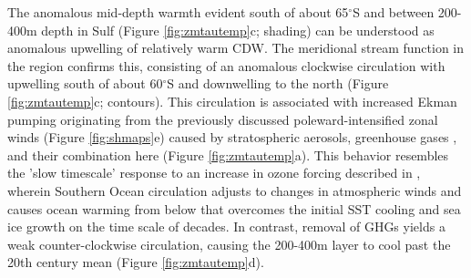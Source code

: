\documentclass[draft,grl]{AGUTeX}  %
\begin{document}
\begin{article}
The anomalous mid-depth warmth evident south of about 65$^\circ$S and between 200-400m depth in Sulf  (Figure \ref{fig:zmtautemp}c; shading) can be understood as anomalous upwelling of relatively warm CDW. The meridional stream function in the region confirms this, consisting of an anomalous clockwise circulation with upwelling south of about 60$^\circ$S and downwelling to the north (Figure \ref{fig:zmtautemp}c; contours). This circulation is associated with increased Ekman pumping originating from the previously discussed poleward-intensified zonal winds (Figure \ref{fig:shmaps}e) caused by stratospheric aerosols, greenhouse gases \citep{fyfe07}, and their combination here (Figure \ref{fig:zmtautemp}a). This behavior resembles the 'slow timescale' response to an increase in ozone forcing described in \citet{ferreira14}, wherein Southern Ocean circulation adjusts to changes in atmospheric winds and causes ocean warming from below that overcomes the initial SST cooling and sea ice growth on the time scale of decades. In contrast, removal of GHGs yields a weak counter-clockwise circulation, causing the 200-400m layer to cool past the 20th century mean (Figure \ref{fig:zmtautemp}d).


\end{article}
\end{document}
